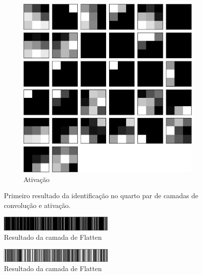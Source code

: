 \documentclass[
	12pt,				%
	oneside,			%
	a4paper,			%
	english,			%
	french,				%
	spanish,			%
	brazil,				%
	]{abntex2}
\begin{document}
\begin{center}
\begin{figure}
	\begin{subfigure}{.8\textwidth}
		\centering
		\includegraphics[width=.6\linewidth]{images/fabio/resultados/network_3/input_1_layer_activation_4}%
		\caption{Ativação}			
	\end{subfigure}%
	\label{fig:camada_2}
	\caption{Primeiro resultado da identificação no quarto par de camadas de convolução e ativação.}
\end{figure}
\end{center}
\begin{center}
\begin{figure}
	\centering
	\includegraphics[width=0.5\textwidth]{images/fabio/resultados/network_3/input_1_layer_flatten_1}
	\caption{Resultado da camada de Flatten}
	\label{fig:input1flatten}
\end{figure}
\end{center}

\begin{center}
\begin{figure}
	\centering
	\includegraphics[width=0.5\textwidth]{images/fabio/resultados/network_3/input_1_layer_dense_1}
	\caption{Resultado da camada de Flatten}
	\label{fig:input1dense1}
\end{figure}
\end{center}
\end{document}
